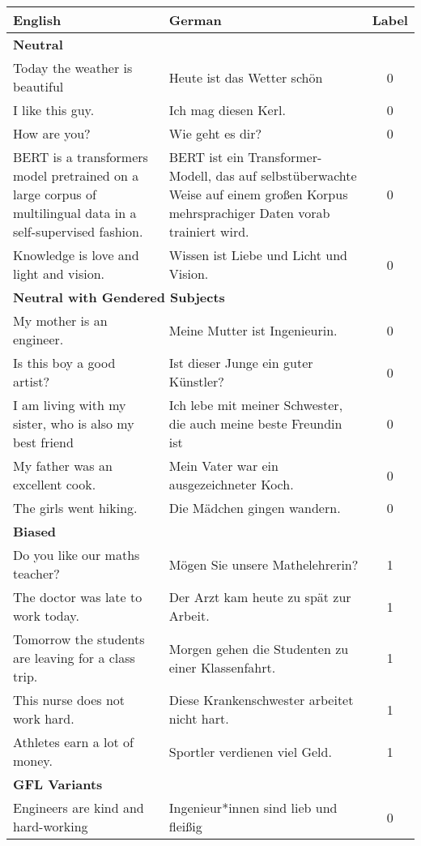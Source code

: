 \begin{longtable}{|p{6.5cm}|p{6.5cm}|c|}
\hline
\textbf{English} & \textbf{German} & \textbf{Label} \\
\hline
\multicolumn{3}{|l|}{\textbf{Neutral}} \\
\hline
Today the weather is beautiful & Heute ist das Wetter schön & 0 \\
I like this guy. & Ich mag diesen Kerl. & 0 \\
How are you? & Wie geht es dir? & 0 \\
BERT is a transformers model pretrained on a large corpus of multilingual data in a self-supervised fashion. & BERT ist ein Transformer-Modell, das auf selbstüberwachte Weise auf einem großen Korpus mehrsprachiger Daten vorab trainiert wird. & 0 \\
Knowledge is love and light and vision. & Wissen ist Liebe und Licht und Vision. & 0 \\
\hline
\multicolumn{3}{|l|}{\textbf{Neutral with Gendered Subjects}} \\
\hline
My mother is an engineer. & Meine Mutter ist Ingenieurin. & 0 \\
Is this boy a good artist? & Ist dieser Junge ein guter Künstler? & 0 \\
I am living with my sister, who is also my best friend & Ich lebe mit meiner Schwester, die auch meine beste Freundin ist & 0 \\
My father was an excellent cook. & Mein Vater war ein ausgezeichneter Koch. & 0 \\
The girls went hiking. & Die Mädchen gingen wandern. & 0 \\
\hline
\multicolumn{3}{|l|}{\textbf{Biased}} \\
\hline
Do you like our maths teacher? & Mögen Sie unsere Mathelehrerin? & 1 \\
The doctor was late to work today. & Der Arzt kam heute zu spät zur Arbeit. & 1 \\
Tomorrow the students are leaving for a class trip. & Morgen gehen die Studenten zu einer Klassenfahrt. & 1 \\
This nurse does not work hard. & Diese Krankenschwester arbeitet nicht hart. & 1 \\
Athletes earn a lot of money. & Sportler verdienen viel Geld. & 1 \\
\hline
\multicolumn{3}{|l|}{\textbf{GFL Variants}} \\
\hline
Engineers are kind and hard-working & Ingenieur*innen sind lieb und fleißig & 0 \\

\end{longtable}
